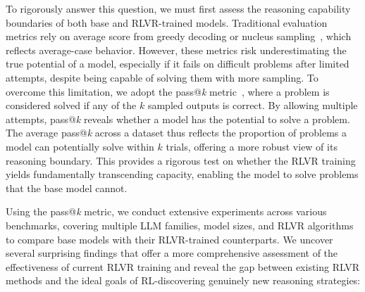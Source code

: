 To rigorously answer this question, we must first assess the reasoning capability boundaries of both base and RLVR-trained models. Traditional evaluation metrics rely on average score from greedy decoding or nucleus sampling~\cite{holtzman2019topp}, which reflects average-case behavior. However, these metrics risk underestimating the true potential of a model, especially if it fails on difficult problems after limited attempts, despite being capable of solving them with more sampling.
To overcome this limitation, we adopt the pass@\textit{k} metric~\cite{brown2024monkey}, where a problem is considered solved if any of the $k$ sampled outputs is correct. By allowing multiple attempts, pass@\textit{k} reveals whether a model has the potential to solve a problem. 
The average pass@\textit{k} across a dataset thus reflects the proportion of problems a model can potentially solve within $k$ trials, offering a more robust view of its reasoning boundary. 
This provides a rigorous test on whether the RLVR training yields fundamentally transcending capacity, enabling the model to solve problems that the base model cannot.

Using the pass@\textit{k} metric, we conduct extensive experiments across various benchmarks, 
covering multiple LLM families, model sizes, and RLVR algorithms to compare base models with their RLVR-trained counterparts.
We uncover several surprising findings that offer a more comprehensive assessment of the effectiveness of current RLVR training and reveal the gap between existing RLVR methods and the ideal goals of RL-discovering genuinely new reasoning strategies:


